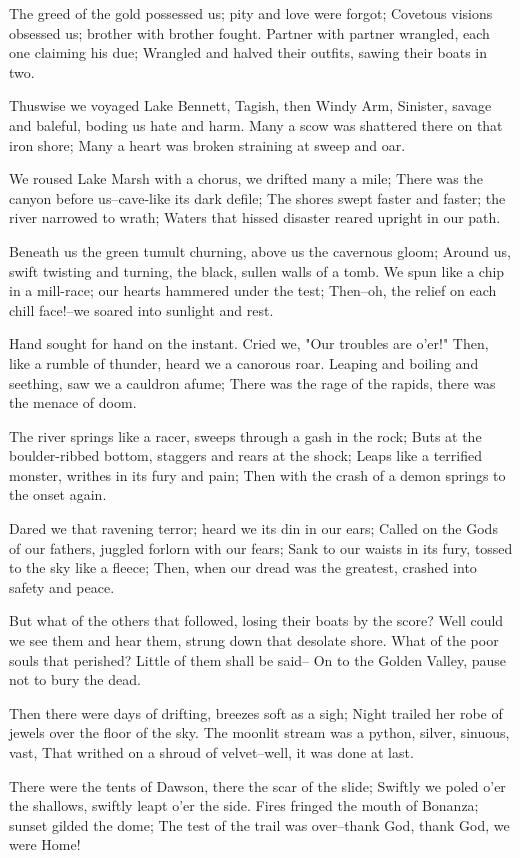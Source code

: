 \begin{poemblock}
 The greed of the gold possessed us; pity and love were forgot;
 Covetous visions obsessed us; brother with brother fought.
 Partner with partner wrangled, each one claiming his due;
 Wrangled and halved their outfits, sawing their boats in two.

 Thuswise we voyaged Lake Bennett, Tagish, then Windy Arm,
 Sinister, savage and baleful, boding us hate and harm.
 Many a scow was shattered there on that iron shore;
 Many a heart was broken straining at sweep and oar.

 We roused Lake Marsh with a chorus, we drifted many a mile;
 There was the canyon before us--cave-like its dark defile;
 The shores swept faster and faster; the river narrowed to wrath;
 Waters that hissed disaster reared upright in our path.

 Beneath us the green tumult churning, above us the cavernous gloom;
 Around us, swift twisting and turning, the black, sullen walls of a tomb.
 We spun like a chip in a mill-race; our hearts hammered under the test;
 Then--oh, the relief on each chill face!--we soared into sunlight and rest.

 Hand sought for hand on the instant.  Cried we, "Our troubles are o'er!"
 Then, like a rumble of thunder, heard we a canorous roar.
 Leaping and boiling and seething, saw we a cauldron afume;
 There was the rage of the rapids, there was the menace of doom.

 The river springs like a racer, sweeps through a gash in the rock;
 Buts at the boulder-ribbed bottom, staggers and rears at the shock;
 Leaps like a terrified monster, writhes in its fury and pain;
 Then with the crash of a demon springs to the onset again.

 Dared we that ravening terror; heard we its din in our ears;
 Called on the Gods of our fathers, juggled forlorn with our fears;
 Sank to our waists in its fury, tossed to the sky like a fleece;
 Then, when our dread was the greatest, crashed into safety and peace.

 But what of the others that followed, losing their boats by the score?
 Well could we see them and hear them, strung down that desolate shore.
 What of the poor souls that perished?  Little of them shall be said--
 On to the Golden Valley, pause not to bury the dead.

 Then there were days of drifting, breezes soft as a sigh;
 Night trailed her robe of jewels over the floor of the sky.
 The moonlit stream was a python, silver, sinuous, vast,
 That writhed on a shroud of velvet--well, it was done at last.

 There were the tents of Dawson, there the scar of the slide;
 Swiftly we poled o'er the shallows, swiftly leapt o'er the side.
 Fires fringed the mouth of Bonanza; sunset gilded the dome;
 The test of the trail was over--thank God, thank God, we were Home!
\end{poemblock}
